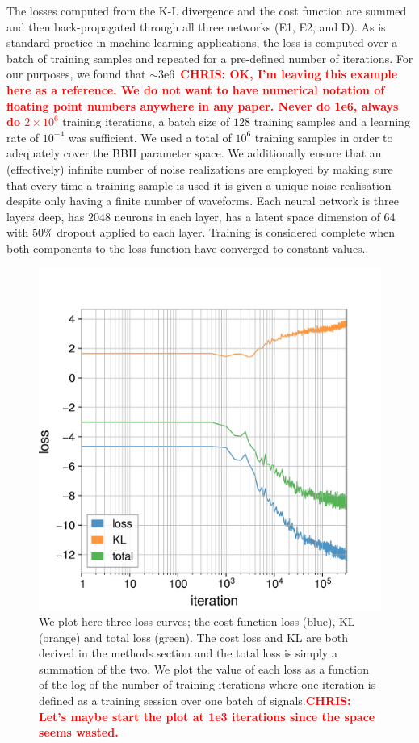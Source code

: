 \documentclass[%
showpacs,
 amsmath,amssymb,
 aps,
 twocolumn,
 prl,
 reprint,
floatfix,
]{revtex4-1}
\newcommand{\chris}[1]{\textbf{\textcolor{red}{CHRIS: #1}}}
\begin{document}
%
%
The losses computed from the K-L divergence and the cost function are summed
and then back-propagated through all three networks (E1, E2, and D).  As is
standard practice in machine learning applications, the loss is computed over a
batch of training samples and repeated for a pre-defined number of iterations.
For our purposes, we found that $\sim3\textrm{e}6$~\chris{OK, I'm leaving this
example here as a reference. We do not want to have numerical notation of
floating point numbers anywhere in any paper. Never do 1e6, always do $2\times
10^6$} training iterations, a batch size of $128$ training samples and a
learning rate of $10^{-4}$ was sufficient. We used a total of $10^6$ training
samples in order to adequately cover the \ac{BBH} parameter space.  We
additionally ensure that an (effectively) infinite number of noise realizations
are employed by making sure that every time a training sample is used it is
given a unique noise realisation despite only having a finite number of
waveforms. Each neural network is three layers deep, has $2048$ neurons in each
layer, has a latent space dimension of $64$ with $50\%$ dropout applied to each
layer. Training is considered complete when both components to the loss
function have converged to constant values..

%
%
\begin{figure}
    \includegraphics[width=\columnwidth]{images/inv_losses_log.png}
\caption{\label{fig:loss_log} We plot here three loss curves; the cost
function loss (blue), KL (orange) and total loss (green). The cost  loss and KL
are both derived in the methods section and the total loss is simply a
summation of the two. We plot the value of each loss as a function of the log
of the number of training iterations where one iteration is defined as a
training session over one batch of signals.\chris{Let's maybe start the plot at
1e3 iterations since the space seems wasted.}} 
\end{figure}
\end{document}
